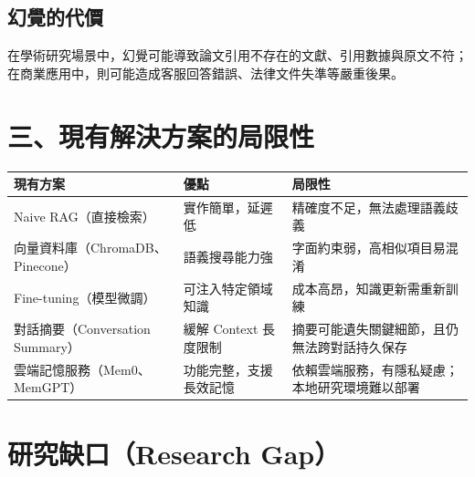 \subsection{幻覺的代價}\label{ux5e7bux89baux7684ux4ee3ux50f9}

在學術研究場景中，幻覺可能導致論文引用不存在的文獻、引用數據與原文不符；在商業應用中，則可能造成客服回答錯誤、法律文件失準等嚴重後果。

\section{三、現有解決方案的局限性}\label{ux4e09ux73feux6709ux89e3ux6c7aux65b9ux6848ux7684ux5c40ux9650ux6027}

{\def\LTcaptype{none} %
\begin{longtable}[]{@{}
  >{\raggedright\arraybackslash}p{}
  >{\raggedright\arraybackslash}p{}
  >{\raggedright\arraybackslash}p{}@{}}
\toprule\noalign{}
\begin{minipage}[b]{\linewidth}\raggedright
現有方案
\end{minipage} & \begin{minipage}[b]{\linewidth}\raggedright
優點
\end{minipage} & \begin{minipage}[b]{\linewidth}\raggedright
局限性
\end{minipage} \\
\midrule\noalign{}
\endhead
\bottomrule\noalign{}
\endlastfoot
Naive RAG（直接檢索） & 實作簡單，延遲低 &
精確度不足，無法處理語義歧義 \\
向量資料庫（ChromaDB、Pinecone） & 語義搜尋能力強 &
字面約束弱，高相似項目易混淆 \\
Fine-tuning（模型微調） & 可注入特定領域知識 &
成本高昂，知識更新需重新訓練 \\
對話摘要（Conversation Summary） & 緩解 Context 長度限制 &
摘要可能遺失關鍵細節，且仍無法跨對話持久保存 \\
雲端記憶服務（Mem0、MemGPT） & 功能完整，支援長效記憶 &
依賴雲端服務，有隱私疑慮；本地研究環境難以部署 \\
\end{longtable}
}

\section{研究缺口（Research
Gap）}\label{ux7814ux7a76ux7f3aux53e3research-gap}

